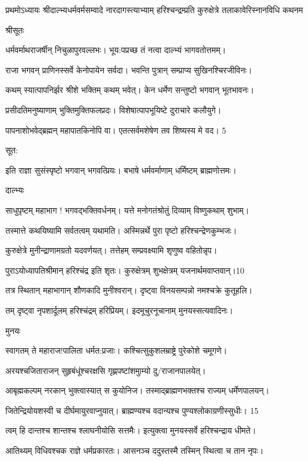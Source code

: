 प्रथमोऽध्यायः
श्रीदाल्भ्यधर्मवर्मसम्वादे नारदागस्त्याभ्याम्
हरिश्चन्द्रम्प्रति कुरुक्षेत्रे
तलाकावेरिस्नानविधि कथनम

श्रीसूतः

धर्मवर्माथराजर्षीन् निचुळापुरवल्लभः।
भूय:पप्रच्छ तं नत्वा दाल्भ्यं भागवतोत्तमम्।

राजा भगवन् प्राणिनस्सर्वे केनोपायेन सर्वदा।
भवन्ति पुत्रान् सम्प्राप्य सुखिनश्चिरजीविनः।

कथम् स्यात्पापनिर्झर श्रीशे भक्तिम् कथम् भवेत्।
केन धर्मेण सन्तुष्टो भगवान् भूतभावनः।

प्रसीदतिमनुष्याणाम् भुक्तिमुक्तिफलप्रदः।
विशेषात्पापभूयिष्टे दुराचारे कलौयुगे।

पापनाशोभवेद्ब्रह्मन् महापातकिनोपि वा।
एतत्सर्वमशेषेण तव शिष्यस्य मे वद। 5

सूत:

इति राज्ञा सुसंस्पृष्टो भगवान् भगवत्प्रियः।
बभाषे धर्मवर्माणाम् धर्मिष्टम् ब्राह्मणोत्तमः।

दाल्भ्यः

साधुपृष्टम् महाभाग ! भगवद्भक्तिवर्धनम्।
यत्ते मनोगतंश्रोतुं दिव्याम् विष्णुकथाम् शुभाम्।

तस्मात्ते कथयिष्यामि सर्वतत्वम् यथामति।
अस्मिन्नर्थे पुरा पृष्टो हरिश्चन्द्रेणकुम्भजः।

कुरुक्षेत्रे मुनीन्द्राणामग्रतो यदवर्णयत्।
तत्तेहम् सम्प्रवक्ष्यामि शृणुष्व वहितोन्नृप।

पुराऽयोध्यापतिश्रीमान् हरिश्चंद्र इति शृतः।
कुरुक्षेत्रम् शुभक्षेत्रम् यजनार्थमवाप्तवान्।10

तत्र स्थितान् महाभागान् शौणकादि मुनीश्वरान्।
दृष्ट्वा विनयसम्पन्नो नमश्चक्रे कुतूहलि।

तम् दृष्ट्वा नृपशार्दूलम् हरिश्चंद्रम् हरिप्रियम्।
इदमूचुरनूचानाम् मुनयस्सत्यवादिनः।

मुनयः

स्वागतम् ते महाराज!पालिता धर्मत:प्रजाः।
कश्चित्सुकुशलम्राष्ट्रे पुरेकोशे चमूगणे।

अरयश्चजिताराजन् सुहृबंधूंश्चरक्षसि
गृह्णपष्टांशमुाम्यो दु/राजानपालयेत्।

आबृह्मकल्पम् नरकान् भुक्त्वास्यात् स कुयोनिज।
तस्माद्ब्राह्मणभक्तश्च राज्यम् धर्मेणपालयन्।

जितेन्द्रियोयशस्वी च दीर्घमायुरवाप्नुयात्।
ब्राह्मण्यश्च वदान्यश्च पुण्यश्लोकाग्रणीस्सुधीः। 15

त्वम् हि दान्तश्च शान्तश्च श्लाघनीयोसि सत्तमैः।
इत्युक्त्वा मुनयस्सर्वे हरिश्चन्द्राय धीमते।

आतिथ्यम् विधिवश्चक राज्ञे धर्मप्रकारतः।
आसनञ्च ददुस्तस्मै तस्मिन् स्थित्वा च तान नृपः।

